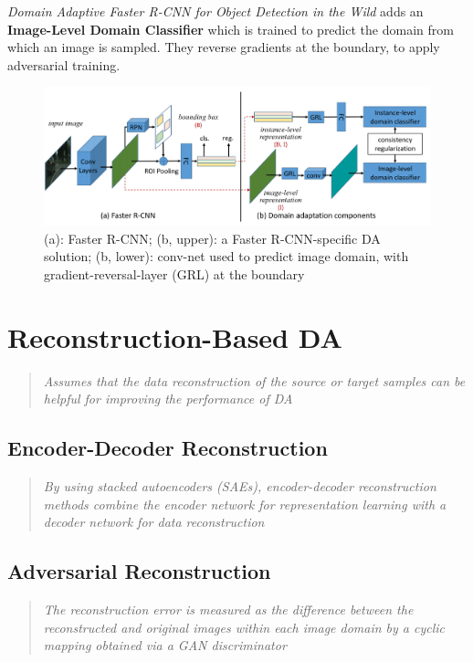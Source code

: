 \documentclass{report}
\newcommand{\quoteit}[1]{\begin{quote}\textit{#1}\end{quote}}
\begin{document}
\textit{Domain Adaptive Faster R-CNN for Object Detection in the Wild}\parencite{adaptrcnn} adds an \textbf{Image-Level Domain Classifier} which is trained to predict the domain from which an image is sampled. They reverse gradients at the boundary, to apply adversarial training.
\begin{figure}[h!]
	\centering
	\includegraphics[width=14cm]{imgs/adaptrcnn}
	\caption{(a): Faster R-CNN; (b, upper): a Faster R-CNN-specific DA solution; (b, lower): conv-net used to predict image domain, with gradient-reversal-layer (GRL) at the boundary}
	\label{fig:adaptrcnn}
\end{figure}




\section{Reconstruction-Based DA}

\quoteit{Assumes that the data reconstruction of the source or target samples can be helpful for improving the performance of DA}

\subsection{Encoder-Decoder Reconstruction}
\quoteit{By using stacked autoencoders (SAEs), encoder-decoder reconstruction methods combine the encoder network for representation learning with a decoder network for data reconstruction}

\subsection{Adversarial Reconstruction}
\quoteit{The reconstruction error is measured as the difference between the reconstructed and original images within each image domain by a cyclic mapping obtained via a GAN discriminator}





\setcounter{chapter}{2}
\end{document}
